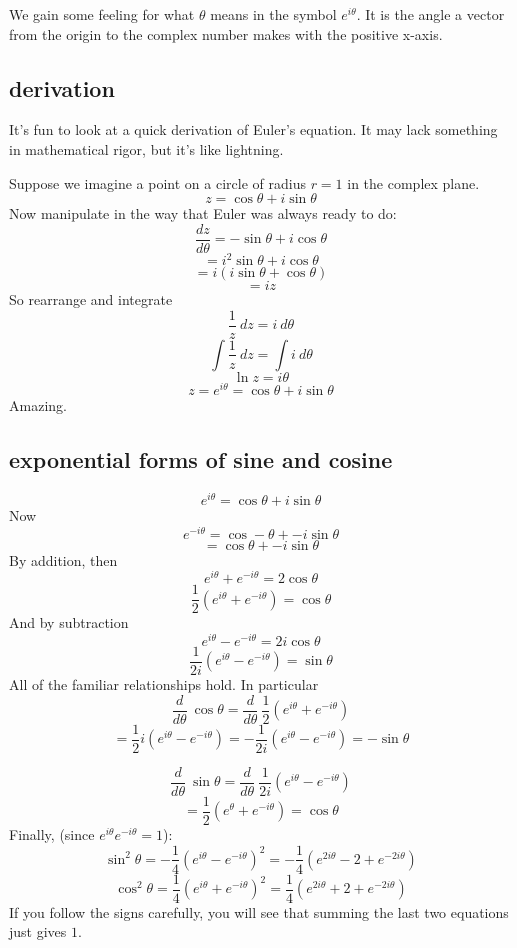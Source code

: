 \documentclass[11pt, oneside]{article}   	%
\begin{document}
We gain some feeling for what $\theta$ means in the symbol $e^{i\theta}$.  It is the angle a vector from the origin to the complex number makes with the positive x-axis.

\subsection*{derivation}
It's fun to look at a quick derivation of Euler's equation.  It may lack something in mathematical rigor, but it's like lightning.

Suppose we imagine a point on a circle of radius $r = 1$ in the complex plane.
\[ z = \cos \theta + i \sin \theta \]
Now manipulate in the way that Euler was always ready to do:
\[ \frac{dz}{d\theta} = - \sin \theta + i \cos \theta \]
\[ = i^2 \sin \theta + i \cos \theta \]
\[ = i (i \sin \theta + \cos \theta) \]
\[ = i z \]
So rearrange and integrate
\[ \frac{1}{z} \ dz = i \ d\theta \]
\[ \int \frac{1}{z} \ dz = \int i \ d\theta \]
\[ \ln z = i \theta \]
\[ z = e^{i \theta} = \cos \theta + i \sin \theta \]
Amazing.

\subsection*{exponential forms of sine and cosine}
\[ e^{i \theta} = \cos \theta + i \sin \theta \]
Now
\[ e^{-i \theta} = \cos -\theta + -i \sin \theta \]
\[ = \cos \theta + -i \sin \theta \]
By addition, then
\[ e^{i \theta} + e^{-i \theta} = 2 \cos \theta \] 
\[ \frac{1}{2}(e^{i \theta} + e^{-i \theta}) = \cos \theta \] 
And by subtraction
\[ e^{i \theta} - e^{-i \theta} = 2i \cos \theta \] 
\[ \frac{1}{2i}(e^{i \theta} - e^{-i \theta}) = \sin \theta \]
All of the familiar relationships hold.  In particular
\[ \frac{d}{d\theta} \ \cos \theta = \frac{d}{d\theta} \ \frac{1}{2}(e^{i \theta} + e^{-i \theta}) \]
\[ = \frac{1}{2}i(e^{i\theta} - e^{-i \theta}) = -\frac{1}{2i}(e^{i\theta} - e^{-i \theta}) = - \sin \theta \]

\[ \frac{d}{d\theta} \ \sin \theta = \frac{d}{d\theta} \ \frac{1}{2i}(e^{i \theta} - e^{-i \theta}) \]
\[ = \frac{1}{2}(e^{\theta} + e^{-i \theta}) = \cos \theta \]
Finally, (since $e^{i \theta} e^{-i \theta} = 1$):
\[ \sin^2 \theta = -\frac{1}{4}(e^{i \theta} - e^{-i \theta})^2 = -\frac{1}{4}(e^{2i \theta} - 2 + e^{-2i \theta} )\]
\[ \cos^2 \theta = \frac{1}{4}(e^{i \theta} + e^{-i \theta})^2 = \frac{1}{4}(e^{2i \theta} + 2 + e^{-2i \theta} )\]
If you follow the signs carefully, you will see that summing the last two equations just gives $1$.
\end{document}
